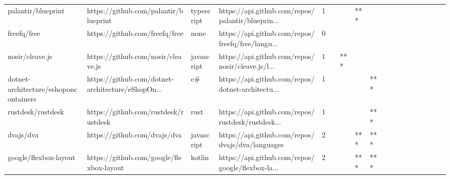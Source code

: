 \begin{tabular}{llllrlllllllllllll}
palantir/blueprint                                 &              https://github.com/palantir/blueprint &        typescript &  https://api.github.com/repos/palantir/blueprin... &       1 &         &        &       *** &                &                 &        &           &           &          &          &       &              &          \\
freefq/free                                        &                     https://github.com/freefq/free &              none &  https://api.github.com/repos/freefq/free/langu... &       0 &         &        &           &                &                 &        &           &           &          &          &       &              &          \\
nosir/cleave.js                                    &                 https://github.com/nosir/cleave.js &        javascript &  https://api.github.com/repos/nosir/cleave.js/l... &       1 &         &    *** &           &                &                 &        &           &           &          &          &       &              &          \\
dotnet-architecture/eshoponcontainers              &  https://github.com/dotnet-architecture/eShopOn... &                c\# &  https://api.github.com/repos/dotnet-architectu... &       1 &         &        &           &            *** &                 &        &           &           &          &          &       &              &          \\
rustdesk/rustdesk                                  &               https://github.com/rustdesk/rustdesk &              rust &  https://api.github.com/repos/rustdesk/rustdesk... &       1 &         &        &           &            *** &                 &        &           &           &          &          &       &              &          \\
dvajs/dva                                          &                       https://github.com/dvajs/dva &        javascript &   https://api.github.com/repos/dvajs/dva/languages &       2 &         &        &       *** &            *** &                 &        &           &           &          &          &       &              &          \\
google/flexbox-layout                              &           https://github.com/google/flexbox-layout &            kotlin &  https://api.github.com/repos/google/flexbox-la... &       2 &         &        &       *** &            *** &                 &        &           &           &          &          &       &              &          \\

\end{tabular}

